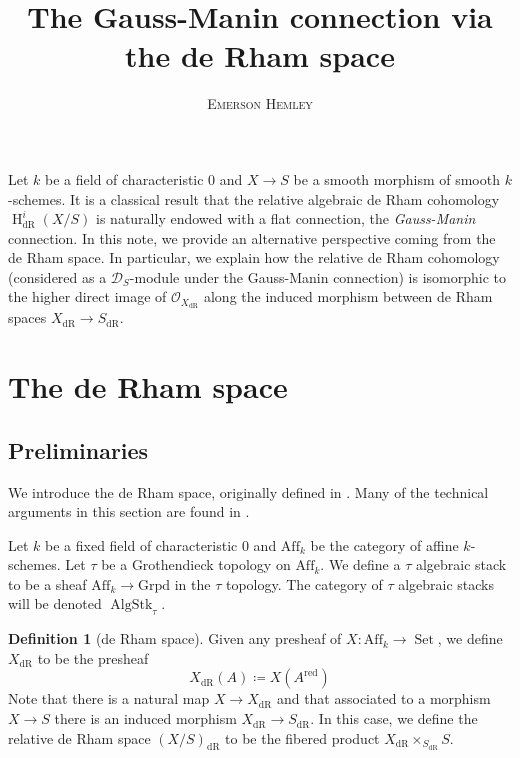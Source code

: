 \documentclass{article}
\date{}
\author{\normalsize\scshape Emerson Hemley}
\title{\vspace{-1.5cm}\large\textbf{The Gauss-Manin connection via the de Rham space}\vspace{-0.5cm}}
\renewenvironment{abstract}{%
  \par\noindent{\textsc{Abstract.}}\small }
{\par\vspace{0.2em}}
\theoremstyle{definition}
\newtheorem{definition}[theorem]{Definition}
\theoremstyle{remark}
\newcommand{\scr}[1]{\mathscr{#1}}
\DeclareMathOperator{\dr}{dR}
\DeclareMathOperator{\red}{red}
\DeclareMathOperator{\h}{H}
\DeclareMathOperator{\algstk}{AlgStk}
\DeclareMathOperator{\set}{Set}
\begin{document}
\maketitle

\begin{abstract}
Let $k$ be a field of characteristic 0 and $X \to S$ be a smooth morphism of smooth $k$-schemes. It is a classical result that the relative algebraic de Rham cohomology $\h_{\dr}^i(X/S)$ is naturally endowed with a flat connection, the \emph{Gauss-Manin} connection. In this note, we provide an alternative perspective coming from the de Rham space. In particular, we explain how the relative de Rham cohomology (considered as a $\scr{D}_S$-module under the Gauss-Manin connection) is isomorphic to the higher direct image of $\scr{O}_{X_{\dr}}$ along the induced  morphism between de Rham spaces $X_{\dr} \to S_{\dr}$.

\end{abstract}

\tableofcontents

\section{The de Rham space}

\subsection{Preliminaries} We introduce the de Rham space, originally defined in \cite{Simpson1996}. Many of the technical arguments in this section are found in \cite{Rib24}. 

Let $k$ be a fixed field of characteristic 0 and $\text{Aff}_k$ be the category of affine $k$-schemes. Let $\tau$ be a Grothendieck topology on $\text{Aff}_k$. We define a $\tau$ algebraic stack to be a sheaf $\text{Aff}_k \to \text{Grpd}$ in the $\tau$ topology. The category of $\tau$ algebraic stacks will be denoted $\algstk_\tau$.

\begin{definition}[de Rham space] Given any presheaf of $X: \text{Aff}_k \to \set$, we define $X_{\dr}$ to be the presheaf 
$$ X_{\dr}(A) \coloneqq X(A^{\red})$$
Note that there is a natural map $X \to X_{\dr}$ and that associated to a morphism $X \to S$ there is an induced morphism $X_{\dr} \to S_{\dr}$. In this case, we define the relative de Rham space $(X/S)_{\dr}$ to be the fibered product $X_{\dr} \times_{S_{\dr}} S$.
\end{definition}
\end{document}
